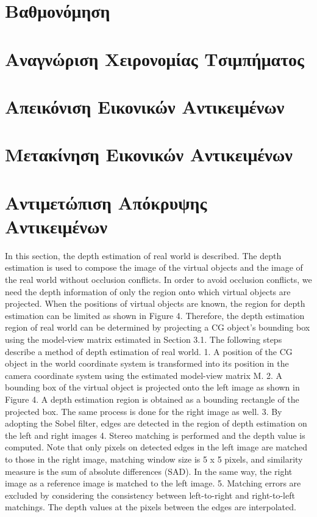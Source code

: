 \section{Βαθμονόμηση}




\section{Αναγνώριση Χειρονομίας Τσιμπήματος}

\section{Απεικόνιση Εικονικών Αντικειμένων} \label{s:rendering}

\section{Μετακίνηση Εικονικών Αντικειμένων} \label{s:manipulation}


\section{Αντιμετώπιση Απόκρυψης Αντικειμένων} \label{s:occlusion}

In this section, the depth estimation of real world is described.
The depth estimation is used to compose the image
of the virtual objects and the image of the real world without
occlusion conflicts. In order to avoid occlusion conflicts, we
need the depth information of only the region onto which
virtual objects are projected. When the positions of virtual
objects are known, the region for depth estimation can be
limited as shown in Figure 4. Therefore, the depth estimation
region of real world can be determined by projecting
a CG object’s bounding box using the model-view matrix
estimated in Section 3.1. The following steps describe a
method of depth estimation of real world.
1. A position of the CG object in the world coordinate
system is transformed into its position in the camera
coordinate system using the estimated model-view matrix
M.
2. A bounding box of the virtual object is projected onto
the left image as shown in Figure 4. A depth estimation
region is obtained as a bounding rectangle of the
projected box. The same process is done for the right
image as well.
3. By adopting the Sobel filter, edges are detected in the
region of depth estimation on the left and right images
4. Stereo matching is performed and the depth value is
computed. Note that only pixels on detected edges in
the left image are matched to those in the right image,
matching window size is 5 x 5 pixels, and similarity
measure is the sum of absolute differences (SAD). In
the same way, the right image as a reference image is
matched to the left image.
5. Matching errors are excluded by considering the consistency
between left-to-right and right-to-left matchings.
The depth values at the pixels between the edges
are interpolated.


